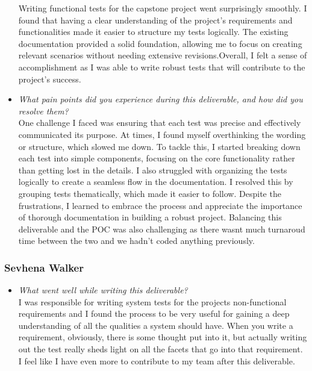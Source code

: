 \documentclass[12pt, titlepage]{article}
\begin{document}
\begin{appendices}
\begin{itemize}
  Writing functional tests for the capstone project went surprisingly 
  smoothly. I found that having a clear understanding of the project's 
  requirements and functionalities made it easier to structure my tests 
  logically. The existing documentation provided a solid foundation, 
  allowing me to focus on creating relevant scenarios without needing 
  extensive revisions.Overall, I felt a sense of accomplishment as I was able to
  write robust tests that will contribute to the project's 
  success.

  \item \textit{What pain points did you experience during this deliverable, and how did you resolve them?}\\ 
  
  One challenge I faced was ensuring that each test was precise and 
  effectively communicated its purpose. At times, I found myself 
  overthinking the wording or structure, which slowed me down. To 
  tackle this, I started breaking down each test into simple components, 
  focusing on the core functionality rather than getting lost in the 
  details. I also struggled with organizing the tests logically to 
  create a seamless flow in the documentation. I resolved this by 
  grouping tests thematically, which made it easier to follow. Despite 
  the frustrations, I learned to embrace the process and appreciate the 
  importance of thorough documentation in building a robust project. 
  Balancing this deliverable and the POC was also challenging as there 
  wasnt much turnaroud time between the two and we hadn't coded anything 
  previously.

\end{itemize}

\subsubsection*{Sevhena Walker}
\begin{itemize}
  \item \textit{What went well while writing this deliverable?} \\
  
  I was responsible for writing system tests for the projects non-functional requirements and I found the process to be very useful for gaining a deep understanding of all the qualities a system should have. When you write a requirement, obviously, there is some thought put into it, but actually writing out the test really sheds light on all the facets that go into that requirement. I feel like I have even more to contribute to my team after this deliverable.


\end{itemize}
\end{appendices}
\end{document}
